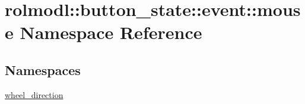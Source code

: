 \hypertarget{namespacerolmodl_1_1button__state_1_1event_1_1mouse}{}\section{rolmodl\+::button\+\_\+state\+::event\+::mouse Namespace Reference}
\label{namespacerolmodl_1_1button__state_1_1event_1_1mouse}
\subsection*{Namespaces}
\begin{DoxyCompactItemize}
\item 
 \mbox{\hyperlink{namespacerolmodl_1_1button__state_1_1event_1_1mouse_1_1wheel__direction}{wheel\+\_\+direction}}
\end{DoxyCompactItemize}
